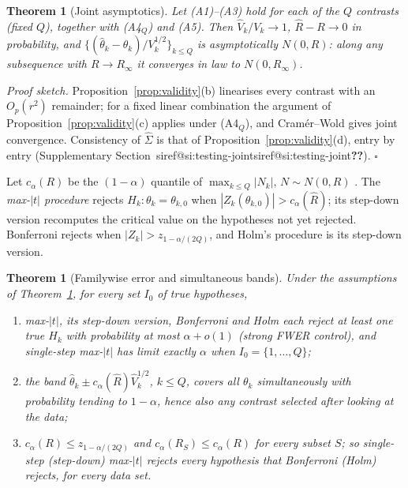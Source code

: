 \documentclass[pdflatex,sn-mathphys-num,iicol]{sn-jnl}
\makeatletter
\theoremstyle{thmstyleone}
\newtheorem{theorem}[proposition]{Theorem}
\theoremstyle{thmstyletwo}
\theoremstyle{thmstylethree}
\newcommand{\SIref}[1]{\ifcsname siref@#1\endcsname\csname siref@#1\endcsname\else\textbf{??}\fi}
\makeatother
\begin{document}
\begin{theorem}[Joint asymptotics]\label{thm:joint}
Let (A1)--(A3) hold for each of the $Q$ contrasts (fixed $Q$), together with (A4$_Q$) and (A5). Then $\hat V_k/V_k\to1$, $\hat R-R\to0$ in probability, and $\{(\hat\theta_k-\theta_k)/V_k^{1/2}\}_{k\le Q}$ is asymptotically $N(0,R)$: along any subsequence with $R\to R_\infty$ it converges in law to $N(0,R_\infty)$.
\end{theorem}

\emph{Proof sketch.} Proposition~\ref{prop:validity}(b) linearises every contrast with an $O_p(r^2)$ remainder; for a fixed linear combination the argument of Proposition~\ref{prop:validity}(c) applies under (A4$_Q$), and Cram\'er--Wold gives joint convergence. Consistency of $\hat\Sigma$ is that of Proposition~\ref{prop:validity}(d), entry by entry (Supplementary Section~\SIref{si:testing-joint}). $\square$

Let $c_\alpha(R)$ be the $(1-\alpha)$ quantile of $\max_{k\le Q}|N_k|$, $N\sim N(0,R)$ \citep{genz2009,hothorn2008}. The \emph{max-$|t|$ procedure} rejects $H_k:\theta_k=\theta_{k,0}$ when $|Z_k(\theta_{k,0})|>c_\alpha(\hat R)$; its step-down version \citep{romano2005stepdown} recomputes the critical value on the hypotheses not yet rejected. Bonferroni rejects when $|Z_k|>z_{1-\alpha/(2Q)}$, and Holm's procedure \citep{holm1979} is its step-down version.

\begin{theorem}[Familywise error and simultaneous bands]\label{thm:fwer}
Under the assumptions of Theorem~\ref{thm:joint}, for every set $I_0$ of true hypotheses,
\begin{enumerate}
\item[(a)] max-$|t|$, its step-down version, Bonferroni and Holm each reject at least one true $H_k$ with probability at most $\alpha+o(1)$ (strong FWER control), and single-step max-$|t|$ has limit exactly $\alpha$ when $I_0=\{1,\dots,Q\}$;
\item[(b)] the band $\hat\theta_k\pm c_\alpha(\hat R)\hat V_k^{1/2}$, $k\le Q$, covers all $\theta_k$ simultaneously with probability tending to $1-\alpha$, hence also any contrast selected after looking at the data;
\item[(c)] $c_\alpha(R)\le z_{1-\alpha/(2Q)}$ and $c_\alpha(R_S)\le c_\alpha(R)$ for every subset $S$; so single-step (step-down) max-$|t|$ rejects every hypothesis that Bonferroni (Holm) rejects, for every data set.
\end{enumerate}
\end{theorem}
\end{document}

